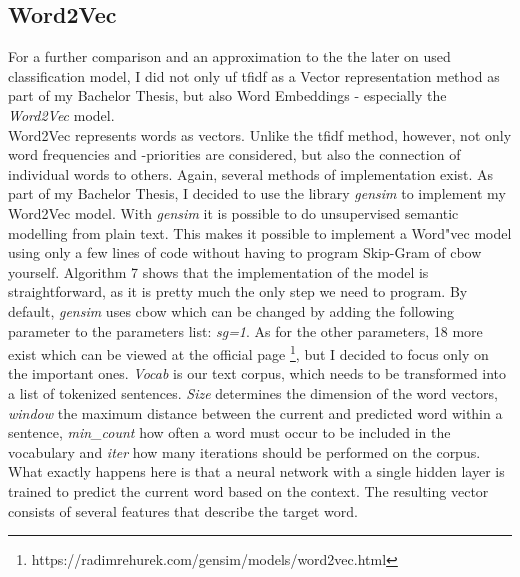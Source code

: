 \documentclass[a4paper, 11pt,titlepage,oneside,openany]{book}
\begin{document}
\newpage
\subsection{Word2Vec} 
For a further comparison and an approximation to the the later on used classification model, I did not only uf \gls{tfidf} as a Vector representation method as part of my Bachelor Thesis, but also Word Embeddings - especially the \textit{Word2Vec} model. \\
Word2Vec represents words as vectors. Unlike the  \gls{tfidf} method, however, not only word frequencies and -priorities are considered, but also the connection of individual words to others. Again, several methods of implementation exist. 
\noindent As part of my Bachelor Thesis, I decided to use  the library \textit{gensim} \cite{gensim} to implement my Word2Vec model. With \textit{gensim} it is  possible to do  unsupervised semantic modelling from plain text. This makes it possible to implement a Word"vec model using only a few lines of code without having to program Skip-Gram of \gls{cbow} yourself. 
 Algorithm 7 shows that the implementation of the model is straightforward, as it is pretty much the only step we need to program. By default, \textit{gensim} uses \gls{cbow} which can be  changed  by adding the following parameter to the parameters list: \textit{sg=1}. As for the other parameters, 18 more exist which can be viewed at the official  page \footnote{https://radimrehurek.com/gensim/models/word2vec.html}, but I decided to focus only on the important ones. \textit{Vocab} is our text corpus, which needs to be transformed into a list of tokenized sentences. \textit{Size} determines the dimension of the word vectors, \textit{window} the maximum distance between the current and predicted word within a sentence, \textit{min\_count}  how often a word must occur to be included in the vocabulary and \textit{iter} how many iterations  should be performed on the corpus. What exactly happens here is that a neural network with a single hidden layer is trained to predict the current word based on the context. The resulting vector consists of several features that describe the target word.
\end{document}
